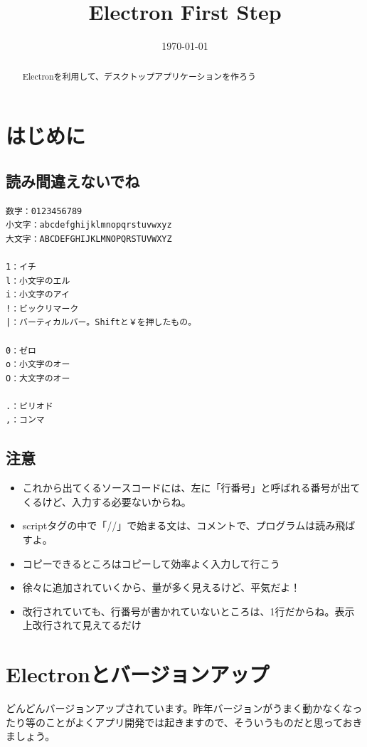 \documentclass[mingoth,11pt,a4j,uplatex]{jsarticle}
\title{Electron First Step}
\date{\today}
\begin{document}

\maketitle

\begin{abstract}
Electronを利用して、デスクトップアプリケーションを作ろう
\end{abstract}

\tableofcontents
\newpage

\section{はじめに}
\subsection{読み間違えないでね}

\begin{lstlisting}[caption=読み間違えないでね]
数字：0123456789
小文字：abcdefghijklmnopqrstuvwxyz
大文字：ABCDEFGHIJKLMNOPQRSTUVWXYZ

1：イチ
l：小文字のエル
i：小文字のアイ
!：ビックリマーク
|：バーティカルバー。Shiftと￥を押したもの。

0：ゼロ
o：小文字のオー
O：大文字のオー

.：ピリオド
,：コンマ
\end{lstlisting}

\subsection{注意}
\begin{itemize}
\item これから出てくるソースコードには、左に「行番号」と呼ばれる番号が出てくるけど、入力する必要ないからね。

\item scriptタグの中で「//」で始まる文は、コメントで、プログラムは読み飛ばすよ。

\item コピーできるところはコピーして効率よく入力して行こう
\item 徐々に追加されていくから、量が多く見えるけど、平気だよ！
\item 改行されていても、行番号が書かれていないところは、1行だからね。表示上改行されて見えてるだけ
\end{itemize}

\newpage
\section{Electronとバージョンアップ}
どんどんバージョンアップされています。昨年バージョンがうまく動かなくなったり等のことがよくアプリ開発では起きますので、そういうものだと思っておきましょう。
\end{document}
